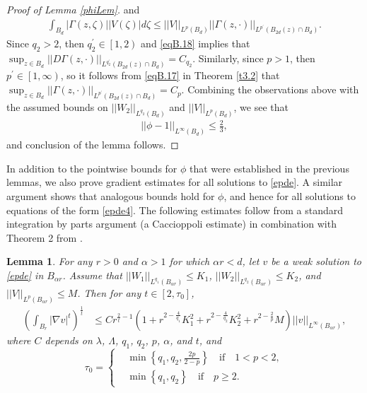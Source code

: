 \documentclass[12pt,reqno]{amsart}
\theoremstyle{plain}
\newtheorem{lem}{Lemma}
\theoremstyle{definition}
\newcommand{\disp}{\displaystyle}
\newcommand{\al}{\alpha}
\newcommand{\Ga}{\Gamma}
\newcommand{\la}{\lambda}
\newcommand{\La}{\Lambda}
\newcommand{\iny}{\infty}
\newcommand{\gr}{\nabla}
\newcommand{\norm}[1]{\left\vert \left\vert #1\right\vert\right\vert}
\newcommand{\abs}[1]{\left\vert#1\right\vert}
\newcommand{\set}[1]{\left\{#1\right\}}
\newcommand{\brac}[1]{\left[#1\right]}
\newcommand{\pr}[1]{\left( #1 \right) }
\newcommand{\brp}[1]{\left[#1\right)}
\begin{document}
\begin{proof}[Proof of Lemma \ref{phiLem}]
and
\begin{align*}
\int_{B_d} \abs{\Ga\pr{z,\zeta}} \abs{ V\pr{\zeta}} d\zeta
\le  \norm{V}_{L^{p}\pr{B_d}}  \norm{\Ga\pr{z,\cdot}}_{L^{p^\prime}\pr{B_{2d}\pr{z} \cap B_d}}.
\end{align*}
Since $q_2 > 2$, then $q_2^\prime \in \brp{1, 2}$ and \eqref{eqB.18} implies that $\disp \sup_{z \in B_d}\norm{D\Ga\pr{z,\cdot}}_{L^{q_2^\prime}\pr{B_{2d}\pr{z}\cap B_d}} = C_{q_2}$.
Similarly, since $p > 1$, then $p^\prime \in \brp{1, \iny}$, so it follows from \eqref{eqB.17} in Theorem \ref{t3.2} that $\disp \sup_{z \in B_d}\norm{\Ga\pr{z,\cdot}}_{L^{p^\prime}\pr{B_{2d}\pr{z}\cap B_d}} = C_{p}$.
Combining the observations above with the assumed bounds on $\norm{W_2}_{L^{q_2}\pr{B_d}}$ and $\norm{V}_{L^{p}\pr{B_d}}$, we see that
\begin{align*}
\norm{\phi - 1}_{L^\iny\pr{B_d}} \le \frac 2 3,
\end{align*}
and conclusion of the lemma follows.
\end{proof}

In addition to the pointwise bounds for $\phi$ that were established in the previous lemmas, we also prove gradient estimates for all solutions to \eqref{epde}. 
A similar argument shows that analogous bounds hold for $\phi$, and hence for all solutions to equations of the form \eqref{epde4}.
The following estimates follow from a standard integration by parts argument (a Caccioppoli estimate) in combination with Theorem 2 from \cite{Mey63}.

\begin{lem}
For any $r > 0$ and $\al > 1$ for which $\al r < d$, let $v$ be a weak solution to \eqref{epde} in $B_{\al r}$.
Assume that $\norm{W_1}_{L^{q_1}\pr{B_{\al r}}} \le K_1$, $\norm{W_2}_{L^{q_2}\pr{B_{\al r}}} \le K_2$, and $\norm{V}_{L^p\pr{B_{\al r}}} \le M$.
Then for any $t \in \brac{2, \tau_0}$,
\begin{align}
\pr{ \int_{B_{r}} \abs{\gr v}^{t}}^{\frac 1 {t}}
&\le C r^{\frac 2 {t} -1}  \pr{1 + r^{2 - \frac {4}{q_1} }K_1^2 + r^{2 - \frac {4}{q_2} }K_2^2 + r^{2 - \frac 2 p } M } \norm{v}_{L^\iny\pr{B_{\al r}}},
\label{Cacc+Est}
\end{align}
where $C$ depends on $\la$, $\La$, $q_1$, $q_2$, $p$, $\al$, and $t$, and
\begin{equation}\label{t0}
\tau_0=\left\{\begin{aligned}
&\min\set{q_1,q_2,\frac{2p}{2-p}}\quad\mbox{if}\quad 1<p<2,\\
&\min\set{q_1,q_2} \quad\mbox{if}\quad p\ge 2.
\end{aligned}\right.
\end{equation}
\label{Cacc+}
\end{lem}
\end{document}
